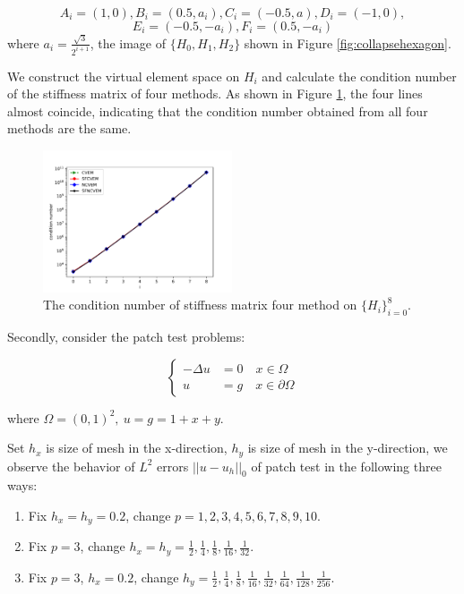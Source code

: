 \documentclass[10pt]{amsart}
\theoremstyle{definition}
\theoremstyle{remark}
\begin{document}
\begin{enumerate}[1.]
$$
A_i = (1, 0), B_i = (0.5, a_i), C_i = (-0.5, a), D_i=(-1, 0), 
$$
$$
E_i = (-0.5, -a_i), F_i = (0.5, -a_i)
$$
where $a_i = \frac{\sqrt{3}}{2^{i+1}}$, the image of $\{H_0, H_1, H_2\}$ shown
in Figure \ref{fig:collapsehexagon}. 

We construct the virtual element space on $H_i$ and calculate the condition number
of the stiffness matrix of four methods. As shown in Figure
\ref{fig:collapsehexagon_conditionnumber}, the four lines
almost coincide, indicating that the condition number obtained from all four
methods are the same.

\begin{figure}[h]
\centering
\includegraphics[width=2.2in]{../figures/collapsing_condition_number.pdf}
\caption{The condition number of stiffness matrix four method on
$\{H_i\}_{i=0}^8$.}
  \label{fig:collapsehexagon_conditionnumber} %
\end{figure}

Secondly,  consider the patch test problems:

$$
\left\{\begin{aligned}
-\Delta u & = 0 \quad x \in \Omega\\
u & = g \quad x \in \partial \Omega
\end{aligned}\right.
$$

where $\Omega = (0, 1)^2, \ u = g = 1+x+y$. 

Set $h_x$ is size of mesh in the x-direction, $h_y$ is size of mesh in the
y-direction,
we observe the behavior of $L^2$ errors $||u - u_h||_0$ of patch test in the following three ways:
\begin{enumerate}[(1)]
\item Fix $h_x=h_y=0.2$, change $p= 1, 2, 3, 4, 5, 6, 7, 8, 9, 10$.
\item Fix $p=3$, change $h_x=h_y=\frac{1}{2}, \frac{1}{4}, \frac{1}{8},
     \frac{1}{16}, \frac{1}{32}$.
\item Fix $p=3$, $h_x=0.2$, change $h_y=\frac{1}{2}, \frac{1}{4}, \frac{1}{8},
    \frac{1}{16}, \frac{1}{32}, \frac{1}{64}, \frac{1}{128}, \frac{1}{256}$.
\end{enumerate}


\end{enumerate}
\end{document}
